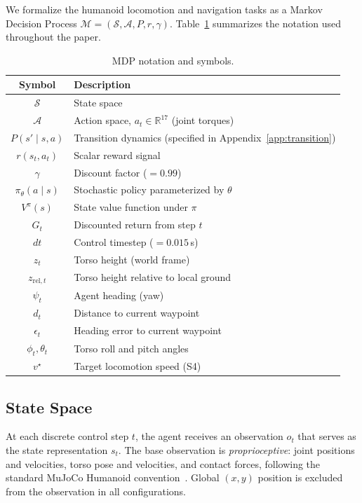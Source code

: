 \documentclass[conference]{IEEEtran}
\begin{document}
We formalize the humanoid locomotion and navigation tasks as a Markov Decision Process $\mathcal{M} = (\mathcal{S}, \mathcal{A}, P, r, \gamma)$. Table~\ref{tab:notation} summarizes the notation used throughout the paper.

\begin{table}[h!]
\caption{MDP notation and symbols.}
\label{tab:notation}
\centering
\small
\begin{tabular}{@{}cl@{}}
\toprule
\textbf{Symbol} & \textbf{Description} \\
\midrule
$\mathcal{S}$ & State space \\
$\mathcal{A}$ & Action space, $a_t \in \mathbb{R}^{17}$ (joint torques) \\
$P(s' \mid s, a)$ & Transition dynamics (specified in Appendix~\ref{app:transition}) \\
$r(s_t, a_t)$ & Scalar reward signal \\
$\gamma$ & Discount factor ($= 0.99$) \\
$\pi_\theta(a \mid s)$ & Stochastic policy parameterized by $\theta$ \\
$V^{\pi}(s)$ & State value function under $\pi$ \\
$G_t$ & Discounted return from step $t$ \\
$dt$ & Control timestep ($= 0.015\,$s) \\
$z_t$ & Torso height (world frame) \\
$z_{\mathrm{rel},t}$ & Torso height relative to local ground \\
$\psi_t$ & Agent heading (yaw) \\
$d_t$ & Distance to current waypoint \\
$\epsilon_t$ & Heading error to current waypoint \\
$\phi_t, \theta_t$ & Torso roll and pitch angles \\
$v^\star$ & Target locomotion speed (S4) \\
\bottomrule
\end{tabular}
\end{table}


\subsection{State Space}

At each discrete control step $t$, the agent receives an observation $o_t$ that serves as the state representation $s_t$. The base observation is \emph{proprioceptive}: joint positions and velocities, torso pose and velocities, and contact forces, following the standard MuJoCo Humanoid convention~\cite{todorov2012mujoco}. Global $(x,y)$ position is excluded from the observation in all configurations.
\end{document}
